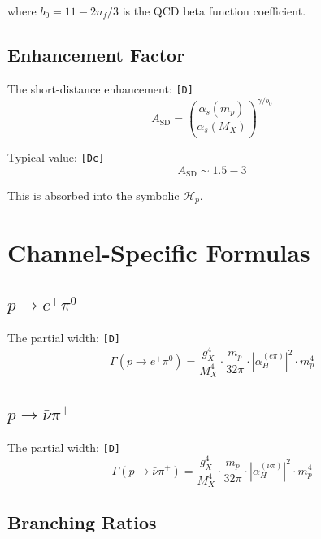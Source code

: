 \documentclass[11pt,a4paper]{article}
\newcommand{\tagD}{\textcolor{green!50!black}{\texttt{[D]}}}
\newcommand{\tagDc}{\textcolor{blue!70!black}{\texttt{[Dc]}}}
\theoremstyle{definition}
\begin{document}
where $b_0 = 11 - 2n_f/3$ is the QCD beta function coefficient.

\subsection{Enhancement Factor}
\label{app:enhancement}

The short-distance enhancement: \tagD{}
\begin{equation}
\label{eq:enhancement}
A_{\text{SD}} = \left(\frac{\alpha_s(m_p)}{\alpha_s(M_X)}\right)^{\gamma/b_0}
\end{equation}

Typical value: \tagDc{}
\begin{equation}
\label{eq:enhancement-value}
A_{\text{SD}} \sim 1.5 - 3
\end{equation}

This is absorbed into the symbolic $\mathcal{H}_p$.

\section{Channel-Specific Formulas}
\label{app:channels}

\subsection{$p \to e^+ \pi^0$}
\label{app:epi0}

The partial width: \tagD{}
\begin{equation}
\label{eq:width-epi0}
\Gamma(p \to e^+ \pi^0) = \frac{g_X^4}{M_X^4} \cdot \frac{m_p}{32\pi} \cdot |\alpha_H^{(e\pi)}|^2 \cdot m_p^4
\end{equation}

\subsection{$p \to \bar{\nu} \pi^+$}
\label{app:nupi}

The partial width: \tagD{}
\begin{equation}
\label{eq:width-nupi}
\Gamma(p \to \bar{\nu} \pi^+) = \frac{g_X^4}{M_X^4} \cdot \frac{m_p}{32\pi} \cdot |\alpha_H^{(\nu\pi)}|^2 \cdot m_p^4
\end{equation}

\subsection{Branching Ratios}
\label{app:branching}
\end{document}
